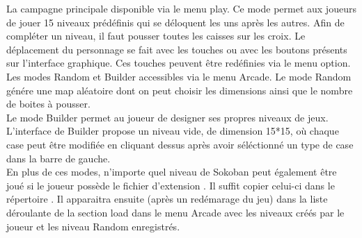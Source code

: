 \documentclass[../main.tex]{subfiles}
\begin{document}
La campagne principale disponible via le menu play. Ce mode permet aux joueurs de jouer
15 niveaux prédéfinis qui se déloquent les uns après les autres. Afin de compléter
un niveau, il faut pousser toutes les caisses sur les croix. Le déplacement du personnage se fait
avec les touches  ou avec les boutons présents sur l'interface graphique. Ces touches 
peuvent être redéfinies via le menu option. \\

Les modes Random et Builder accessibles via le menu Arcade. Le mode Random génére 
une map aléatoire dont on peut choisir les dimensions ainsi que le nombre de boites à pousser. \\
Le mode Builder permet au joueur de designer ses propres niveaux de jeux. \\
L'interface de Builder propose un niveau vide, de dimension 15*15, où chaque case peut être modifiée 
en cliquant dessus après avoir séléctionné un type de case dans la barre de gauche. \\

En plus de ces modes, n'importe quel niveau de Sokoban peut également être joué si le joueur possède le fichier d'extension .
Il suffit copier celui-ci dans le répertoire .
Il apparaitra ensuite (après un redémarage du jeu) dans la liste déroulante de la section load dans le menu Arcade avec les 
niveaux créés par le joueur et les niveau Random enregistrés.

\newpage
\end{document}
